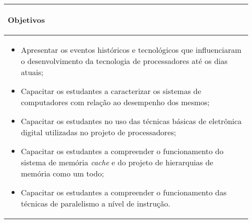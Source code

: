 \hspace{1cm}
\begin{table}[h!]
\centering
\begin{small} 
\setlength{\tabcolsep}{3pt} 
\begin{tabular}{|p{15cm}|}\hline

\begin{center}\textbf{Objetivos}\end{center}\\ \hline
\begin{itemize}

\item Apresentar os eventos históricos e tecnológicos que influenciaram o desenvolvimento da tecnologia de processadores até os dias atuais;
\item Capacitar os estudantes a caracterizar os sistemas de computadores com relação ao desempenho dos mesmos;
\item Capacitar os estudantes no uso das técnicas básicas de eletrônica digital utilizadas no projeto de processadores;
\item Capacitar os estudantes a compreender o funcionamento do sistema de memória \textit{cache} e do projeto de hierarquias de memória como um todo;
\item Capacitar os estudantes a compreender o funcionamento das técnicas de paralelismo a nível de instrução.

\end{itemize}
\\ \hline

\end{tabular} 
\end{small}
\end{table}

